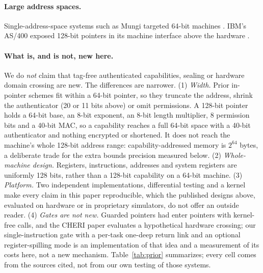 \documentclass[10pt,a4paper]{article}
\begin{document}
\paragraph{Large address spaces.} Single-address-space systems such as Mungi targeted 64-bit machines \citep{mungi}. IBM's AS/400 exposed 128-bit pointers in its machine interface above the hardware \citep{soltis}.
\paragraph{What is, and is not, new here.} We do \emph{not} claim that tag-free authenticated capabilities, sealing or hardware domain crossing are new. The differences are narrower. (1) \emph{Width.} Prior in-pointer schemes fit within a 64-bit pointer, so they truncate the address, shrink the authenticator (20 or 11 bits above) or omit permissions. A 128-bit pointer holds a 64-bit base, an 8-bit exponent, an 8-bit length multiplier, 8 permission bits and a 40-bit MAC, so a capability reaches a full 64-bit space with a 40-bit authenticator and nothing encrypted or shortened. It does not reach the machine's whole 128-bit address range: capability-addressed memory is $2^{64}$ bytes, a deliberate trade for the extra bounds precision measured below. (2) \emph{Whole-machine design.} Registers, instructions, addresses and system registers are uniformly 128 bits, rather than a 128-bit capability on a 64-bit machine. (3) \emph{Platform.} Two independent implementations, differential testing and a kernel make every claim in this paper reproducible, which the published designs above, evaluated on hardware or in proprietary simulators, do not offer an outside reader. (4) \emph{Gates are not new.} Guarded pointers had enter pointers with kernel-free calls, and the CHERI paper evaluates a hypothetical hardware crossing; our single-instruction gate with a per-task one-deep return link and an optional register-spilling mode is an implementation of that idea and a measurement of its costs here, not a new mechanism. Table~\ref{tab:prior} summarizes; every cell comes from the sources cited, not from our own testing of those systems.
\end{document}
